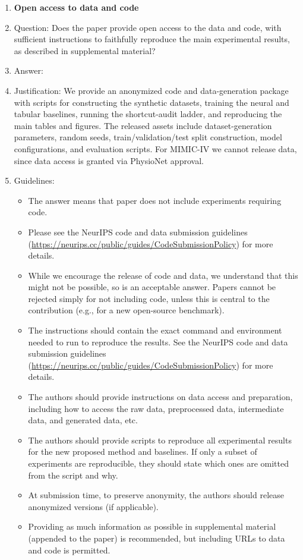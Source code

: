 \documentclass{article}
\theoremstyle{plain}
\theoremstyle{definition}
\theoremstyle{remark}
\begin{document}
\begin{enumerate}
\item {\bf Open access to data and code}
    \item[] Question: Does the paper provide open access to the data and code, with sufficient instructions to faithfully reproduce the main experimental results, as described in supplemental material?
    \item[] Answer: \answerYes{}
    \item[] Justification: We provide an anonymized code and data-generation package with scripts for constructing the synthetic datasets, training the neural and tabular baselines, running the shortcut-audit ladder, and reproducing the main tables and figures. The released assets include dataset-generation parameters, random seeds, train/validation/test split construction, model configurations, and evaluation scripts. For MIMIC-IV we cannot release data, since data access is granted via PhysioNet approval.
    \item[] Guidelines:
    \begin{itemize}
        \item The answer \answerNA{} means that paper does not include experiments requiring code.
        \item Please see the NeurIPS code and data submission guidelines (\url{https://neurips.cc/public/guides/CodeSubmissionPolicy}) for more details.
        \item While we encourage the release of code and data, we understand that this might not be possible, so \answerNo{} is an acceptable answer. Papers cannot be rejected simply for not including code, unless this is central to the contribution (e.g., for a new open-source benchmark).
        \item The instructions should contain the exact command and environment needed to run to reproduce the results. See the NeurIPS code and data submission guidelines (\url{https://neurips.cc/public/guides/CodeSubmissionPolicy}) for more details.
        \item The authors should provide instructions on data access and preparation, including how to access the raw data, preprocessed data, intermediate data, and generated data, etc.
        \item The authors should provide scripts to reproduce all experimental results for the new proposed method and baselines. If only a subset of experiments are reproducible, they should state which ones are omitted from the script and why.
        \item At submission time, to preserve anonymity, the authors should release anonymized versions (if applicable).
        \item Providing as much information as possible in supplemental material (appended to the paper) is recommended, but including URLs to data and code is permitted.
    \end{itemize}



\end{enumerate}
\end{document}
